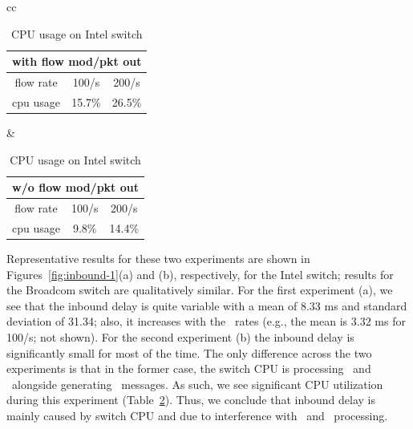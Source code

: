 

\begin{table}
\centering
\begin{scriptsize}
\begin{tabular}{cc}
\begin{tabular}{|c|c|c|}
\hline
\multicolumn{3}{|c|}{with flow mod/pkt out} \\ \hline
flow rate & 100/s  & 200/s  \\ \hline
cpu usage & 15.7\%    & 26.5\%   \\ \hline
\end{tabular}
&
\begin{tabular}{|c|c|c|}
\hline
\multicolumn{3}{|c|}{w/o flow mod/pkt out} \\ \hline
flow rate & 100/s   & 200/s \\ \hline
cpu usage & 9.8\%     & 14.4\%   \\ \hline
\end{tabular}
\end{tabular}
\caption{CPU usage on Intel switch}
\label{fig:inbound-cpu}
\end{scriptsize}
\end{table} 

Representative results for these two experiments are shown in
Figures~\ref{fig:inbound-1}(a) and (b), respectively, for the Intel switch; results
for the Broadcom switch are qualitatively similar.
For the first experiment (a), we see that the
inbound delay is quite variable with a mean of 8.33 ms and standard
deviation of 31.34; also, it increases with the \packetin\
rates (e.g., the mean is 3.32 ms for 100/s; not shown). For the second experiment (b) the inbound delay is
significantly small for most of the time. The only difference across
the two experiments is that in the former case, the switch CPU is processing
\flowmod\ and \packetout\ alongside generating \packetin\ messages. As such, we see significant CPU
utilization during this experiment (Table~\ref{fig:inbound-cpu}).
Thus, we conclude that inbound delay is mainly caused by switch CPU
and due to interference with \flowmod\ and \packetout\ processing.
 
